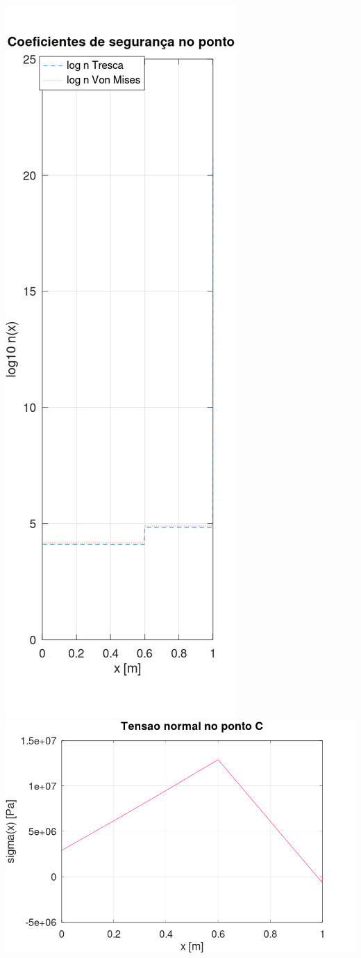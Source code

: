 \documentclass[10pt]{article}
\begin{document}
\begin{center}
    \includegraphics[scale=0.25]{figure26.png}
    \includegraphics[scale=0.25]{figure27.png}

\end{center}
\end{document}
